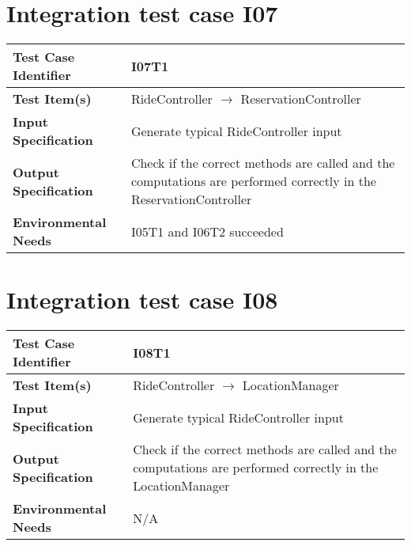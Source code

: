\section{Integration test case I07}\label{I07}
\begin{center}
	\vspace{0.6cm}
	\begin{tabular}{|l|p{10cm}|}
		\hline
		\textbf{Test Case Identifier} & I07T1 \bigstrut \\\hline
		\textbf{Test Item(s)} & RideController \ensuremath{\rightarrow} ReservationController \bigstrut \\\hline
		\textbf{Input Specification} & Generate typical RideController input \bigstrut \\\hline
		\textbf{Output Specification} & Check if the correct methods are called and the computations are performed correctly in the ReservationController \bigstrut \\\hline
		\textbf{Environmental Needs} & I05T1 and I06T2 succeeded \bigstrut \\\hline
	\end{tabular}
\end{center}

\section{Integration test case I08}\label{I08}
\begin{center}
	\vspace{0.6cm}
	\begin{tabular}{|l|p{10cm}|}
		\hline
		\textbf{Test Case Identifier} & I08T1 \bigstrut \\\hline
		\textbf{Test Item(s)} & RideController \ensuremath{\rightarrow} LocationManager \bigstrut \\\hline
		\textbf{Input Specification} & Generate typical RideController input \bigstrut \\\hline
		\textbf{Output Specification} & Check if the correct methods are called and the computations are performed correctly in the LocationManager \bigstrut \\\hline
		\textbf{Environmental Needs} & N/A \bigstrut \\\hline
	\end{tabular}
\end{center}

